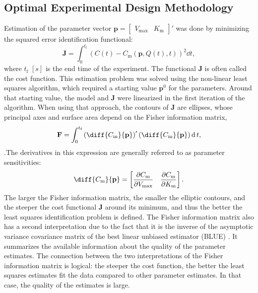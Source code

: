 \subsection{Optimal Experimental Design Methodology}
\label{Information}
Estimation of the parameter vector $\mathbf{p} = \begin{bmatrix}V_{\text{max}} & K_{\text{m}}\end{bmatrix}'$ was done by minimizing the squared error identification functional:
\begin{equation}
\mathbf{J} = \int_{0}^{t_\text{f}} (C(t) - C_\text{m}(\mathbf{p},Q(t),t))^2 \dd{t},
\label{J}
\end{equation}
where $t_\text{f}$ $[s]$ is the end time of the experiment. The functional $\mathbf{J}$ is often called the cost function.  This estimation problem was solved using the non-linear least squares algorithm, which required a starting value $\mathbf{p}^0$ for the parameters. Around that starting value, the model and $\mathbf{J}$ were linearized in the first iteration of the algorithm. When using that approach, the contours of $\mathbf{J}$ are ellipses, whose principal axes and surface area depend on the Fisher information matrix,
\begin{equation}
\mathbf{F} =  \int_{0}^{t_\text{f}}
\left(
\diff{C_\text{m}}{\mathbf{p}}
\right)'
\left(
\diff{C_\text{m}}{\mathbf{p}}
\right) \dd t,
\label{F}
\end{equation}
\parencite{fedorov}.The derivatives in this expression are generally referred to as parameter sensitivities:
\begin{equation}
\diff{C_\text{m}}{\mathbf{p}} =
\begin{bmatrix}
\dfrac{\partial C_\text{m}}{\partial V_{\text{max}}} & \dfrac{\partial C_\text{m}}{\partial K_{\text{m}}}
\end{bmatrix}.
\end{equation}
The larger the Fisher information matrix, the smaller the elliptic contours, and the steeper the cost functional $\mathbf{J}$ around its minimum, and thus the better the least squares identification problem is defined. The Fisher information matrix also has a second interpretation due to the fact that it is the inverse of the asymptotic variance covariance matrix of the best linear unbiased estimator (BLUE)  \parencite{munack1}. It summarizes the available information about the quality of the parameter estimates. The connection between the two interpretations of the Fisher information matrix is logical: the steeper the cost function, the better the least squares estimates fit the data compared to other parameter estimates. In that case, the quality of the estimates is large.
